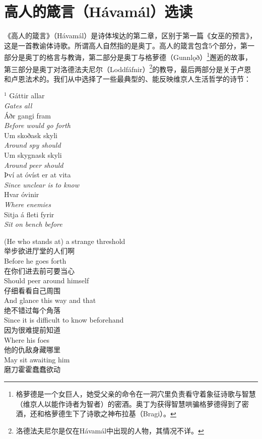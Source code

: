 \section{高人的箴言（Hávamál）选读}
《高人的箴言》（Hávamál）是诗体埃达的第二章，区别于第一篇《女巫的预言》，这是一首教谕体诗歌。所谓高人自然指的是奥丁。高人的箴言包含5个部分，第一部分是奥丁的格言与教诲，第二部分是奥丁与格萝德（Gunnlǫð）\footnote[1]{格萝德是一个女巨人，她受父亲的命令在一洞穴里负责看守着象征诗歌与智慧（维京人以能作诗者为智者）的密酒。奥丁为获得智慧哄骗格萝德得到了密酒，还和格萝德生下了诗歌之神布拉基（Bragi）。}邂逅的故事，第三部分是奥丁对洛德法夫尼尔（Loddfáfnir）\footnote[2]{洛德法夫尼尔是仅在Hávamál中出现的人物，其情况不详。}的教导，最后两部分是关于卢恩和卢恩法术的。我们从中选择了一些最典型的、能反映维京人生活哲学的诗节：
\begin{paracol}{2}
    \noindent
    $^1$ Gáttir allar\\
    \textit{Gates all}\\
    Áðr gangi fram\\
    \textit{Before would go forth}\\
    Um skoðask skyli\\
    \textit{Around spy should}\\
    Um skygnask skyli\\
    \textit{Around peer should }\\
    Því at óvíst er at vita \\
    \textit{Since unclear is to know}\\
    Hvar óvinir \\
    \textit{Where enemies}\\
    Sitja á fleti fyrir\\
    \textit{Sit on bench before}\\
    \switchcolumn

    \noindent
    (He who stands at) a strange threshold\\
    举步欲进厅堂的人们啊\\
    Before he goes forth\\
    在你们进去前可要当心\\
    Should peer around himself\\
    仔细看看自己周围\\
    And glance this way and that\\
    绝不错过每个角落\\
    Since it is difficult to know beforehand\\
    因为很难提前知道\\
    Where his foes\\
    他的仇敌身藏哪里\\
    May sit awaiting him\\
    磨刀霍霍蠢蠢欲动\\

\end{paracol}

